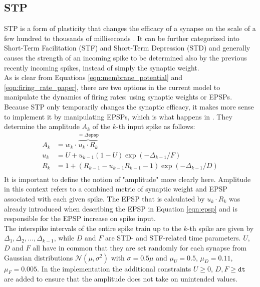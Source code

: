 \subsection{STP} \label{ssec:stp}
STP is a form of plasticity that changes the efficacy of a synapse on the scale of a few hundred to thousands of milliseconds \parencite{stevens_wang_1995}. It can be further categorized into Short-Term Facilitation (STF) and Short-Term Depression (STD) and generally causes the strength of an incoming spike to be determined also by the previous recently incoming spikes, instead of simply the synaptic weight.\\
As is clear from Equations \ref{eqn:membrane_potential} and \ref{eqn:firing_rate_paper}, there are two options in the current model to manipulate the dynamics of firing rates: using synaptic weights or EPSPs. Because STP only temporarily changes the synaptic efficacy, it makes more sense to implement it by manipulating EPSPs, which is what happens in \parencite{klampfl_maass_2013}. They determine the amplitude $A_k$ of the $k$-th input spike as follows:
\begin{equation}
\begin{aligned}
    A_k &= w_k \cdot \overbrace{u_k \cdot R_k}^{=\Delta\texttt{epsp}}\\
    u_k &= U + u_{k-1}(1-U)\exp(-\Delta_{k-1}/F)\\
    R_k &= 1 + (R_{k-1} - u_{k-1}R_{k-1}-1)\exp(-\Delta_{k-1}/D)\\
\end{aligned}
\label{eqn:stp}
\end{equation}
It is important to define the notion of "amplitude" more clearly here. Amplitude in this context refers to a combined metric of synaptic weight and EPSP associated with each given spike. The EPSP that is calculated by $u_k\cdot R_k$ was already introduced when describing the EPSP in Equation \ref{eqn:epsp} and is responsible for the EPSP increase on spike input.\\
The interspike intervals of the entire spike train up to the $k$-th spike are given by $\Delta_1, \Delta_2, \dots, \Delta_{k-1}$, while $D$ and $F$ are STD- and STF-related time parameters. $U$, $D$ and $F$ all have in common that they are set randomly for each synapse from Gaussian distributions $\mathcal{N}(\mu, \sigma^2)$ with $\sigma=0.5\mu$ and $\mu_U=0.5$, $\mu_D=0.11$, $\mu_F=0.005$. In the implementation the additional constraints $U\geq 0$, $D,F\geq \texttt{dt}$ are added to ensure that the amplitude does not take on unintended values.\\
